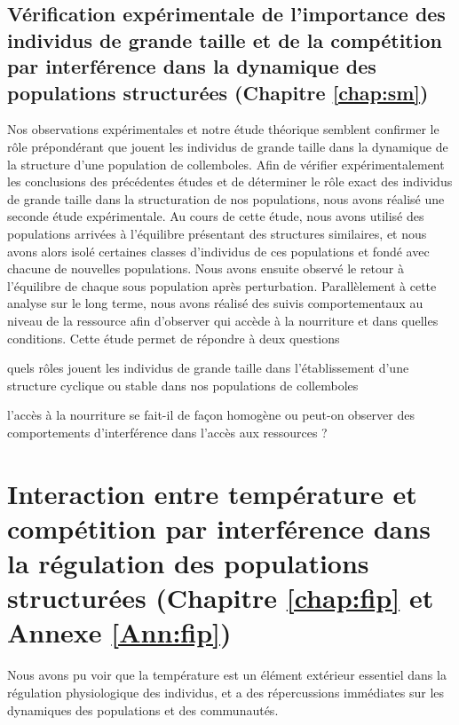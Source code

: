 \subsection{Vérification expérimentale de l'importance des individus de
grande taille et de la compétition par interférence dans la dynamique des
populations structurées (Chapitre \ref{chap:sm})}

Nos observations expérimentales et notre étude théorique semblent confirmer le
rôle prépondérant que jouent les individus de grande taille dans la dynamique de
la structure d'une population de collemboles. Afin de vérifier expérimentalement
les conclusions des précédentes études et de déterminer le rôle exact des
individus de grande taille dans la structuration de nos populations, nous avons
réalisé une seconde étude expérimentale. Au cours de cette étude, nous avons
utilisé des populations arrivées à l'équilibre présentant des structures
similaires, et nous avons alors isolé certaines classes d'individus de ces
populations et fondé avec chacune de nouvelles populations. Nous avons ensuite
observé le retour à l'équilibre de chaque sous population après perturbation.
Parallèlement à cette analyse sur le long terme, nous avons réalisé des suivis
comportementaux au niveau de la ressource afin d'observer qui accède à la
nourriture et dans quelles conditions. Cette étude permet de répondre à deux
questions \begin{enumerate*}[label=(\roman*), before=\unskip{ : }, itemjoin={{ ? }},
itemjoin*={{ ? Et }}] \item quels rôles jouent les individus de grande taille
dans l'établissement d'une structure cyclique ou stable dans nos populations de
collemboles \item l'accès à la nourriture se fait-il de façon homogène ou
peut-on observer des comportements d'interférence dans l'accès aux ressources ?
\end{enumerate*}

\section{Interaction entre température et compétition par interférence dans
la régulation des populations structurées (Chapitre \ref{chap:fip} et Annexe
\ref{Ann:fip})}

Nous avons pu voir que la température est un élément extérieur essentiel dans la
régulation physiologique des individus, et a des répercussions immédiates sur
les dynamiques des populations et des communautés. 

